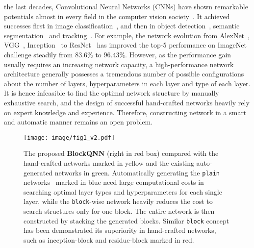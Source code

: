 \documentclass[10pt,journal,compsoc]{IEEEtran}
\begin{document}
\maketitle


\IEEEdisplaynontitleabstractindextext



\IEEEpeerreviewmaketitle




 the last decades, Convolutional Neural Networks (CNNs) have shown remarkable potentials almost in every field in the computer vision society~\cite{lecun2015deep}. 
It achieved successes first in image classification~\cite{krizhevsky2012imagenet}, and then in object detection~\cite{girshick2015fast,ren2015faster}, semantic segmentation~\cite{long2015fully,chen2018deeplab} and tracking~\cite{nam2016learning,bertinetto2016fully}.
For example, the network evolution from AlexNet~\cite{krizhevsky2012imagenet}, VGG~\cite{simonyan2014very}, Inception~\cite{szegedy2015going} to ResNet~\cite{he2015deep} has improved the top-5 performance on ImageNet challenge steadily from $83.6\%$ to $96.43\%$. 
However, as the performance gain usually requires an increasing network capacity, a high-performance network architecture generally possesses a tremendous number of possible configurations about the number of layers, hyperparameters in each layer and type of each layer.
It is hence infeasible to find the optimal network structure by manually exhaustive search, and the design of successful hand-crafted networks heavily rely on expert knowledge and experience.
Therefore, constructing network in a smart and automatic manner remains an open problem. 

\begin{figure*}[tbp]
	\centering
	\texttt{[image: image/fig1\_v2.pdf]}
	\caption{The proposed \textbf{BlockQNN} (right in red box) compared with the hand-crafted networks marked in yellow and the existing auto-generated networks in green. Automatically generating the \texttt{plain} networks~\cite{baker2016designing,zoph2016neural} marked in blue need large computational costs in searching optimal layer types and hyperparameters for each single layer, while the \texttt{block}-wise network heavily reduces the cost to search structures only for one block. The entire network is then constructed by stacking the generated blocks. Similar \texttt{block} concept has been demonstrated its superiority in hand-crafted networks, such as inception-block and residue-block marked in red.}
	\label{fig:motivation_compare}
\end{figure*}
\end{document}
